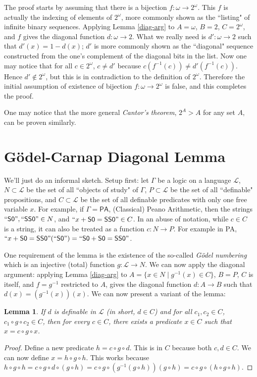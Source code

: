 \documentclass{article}
\newtheorem{lemma}[theorem]{Lemma}
\begin{document}
The proof starts by assuming that there is a bijection $f:\omega \rightarrow 2^{\omega}$. This $f$ is actually the indexing of elements of $2^{\omega}$, more commonly shown as the ``listing" of infinite binary sequences. Applying Lemma \ref{diag-arg} to $A = \omega$, $B = 2$, $C = 2^{\omega}$, and $f$ gives the diagonal function $d:\omega \rightarrow 2$. What we really need is $d':\omega \rightarrow 2$ such that $d'(x) = 1 - d(x)$; $d'$ is more commonly shown as the ``diagonal" sequence constructed from the one's complement of the diagonal bits in the list. Now one may notice that for all $c \in 2^{\omega}$, $c \ne d'$ because $c(f^{-1}(c)) \ne d'(f^{-1}(c))$. Hence $d' \not\in 2^{\omega}$, but this is in contradiction to the definition of $2^{\omega}$. Therefore the initial assumption of existence of bijection $f:\omega \rightarrow 2^{\omega}$ is false, and this completes the proof.

One may notice that the more general \textit{Cantor's theorem}, $2^{A} > A$ for any set $A$, can be proven similarly.

\section{Gödel-Carnap Diagonal Lemma}
We'll just do an informal sketch. Setup first: let $\Gamma$ be a logic on a language $\mathcal{L}$, $N \subset \mathcal{L}$ be the set of all ``objects of study" of $\Gamma$, $P \subset \mathcal{L}$ be the set of all ``definable" propositions, and $C \subset \mathcal{L}$ be the set of all definable predicates with only one free variable $x$. For example, if $\Gamma = \textsf{PA}$, (Classical) Peano Arithmetic, then the strings $``\textsf{S0}", ``\textsf{SS0}" \in N$, and $``x + \textsf{S0} = \textsf{SS0}" \in C$. In an abuse of notation, while $c \in C$ is a string, it can also be treated as a function $c:N \rightarrow P$. For example in \textsf{PA}, $``x + \textsf{S0} = \textsf{SS0}"(``\textsf{S0}") = ``\textsf{S0} + \textsf{S0} = \textsf{SS0}"$.

One requirement of the lemma is the existence of the so-called \textit{Gödel numbering} which is an injective (total) function $g:\mathcal{L} \rightarrow N$. We can now apply the diagonal argument: applying Lemma \ref{diag-arg} to $A = \{x \in N \mid g^{-1}(x) \in C\}$, $B = P$, $C$ is itself, and $f = g^{-1}$ restricted to $A$, gives the diagonal function $d: A \rightarrow B$ such that $d(x) = (g^{-1}(x))(x)$. We can now present a variant of the lemma:

\begin{lemma}
If $d$ is definable in $\mathcal{L}$ (in short, $d \in C$) and for all $c_1, c_2 \in C$, $c_1 \circ g \circ c_2 \in C$, then for every $c \in C$, there exists a predicate $x \in C$ such that $x = c \circ g \circ x$.
\end{lemma}
\begin{proof}
Define a new predicate $h = c \circ g \circ d$. This is in $C$ because both $c, d \in C$. We can now define $x = h \circ g \circ h$. This works because $h \circ g \circ h = c \circ g \circ d \circ (g \circ h) = c \circ g \circ (g^{-1}(g \circ h))(g \circ h) = c \circ g \circ (h \circ g \circ h)$.
\end{proof}
\end{document}
